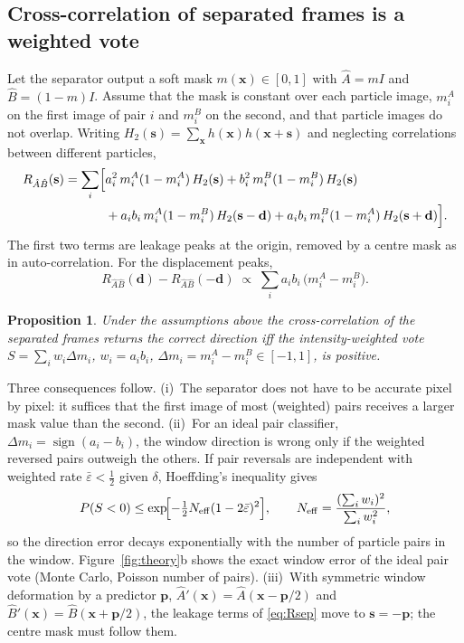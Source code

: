 \documentclass[11pt]{article}
\newtheorem{proposition}{Proposition}
\theoremstyle{remark}
\newcommand{\x}{\mathbf{x}}
\newcommand{\s}{\mathbf{s}}
\newcommand{\dd}{\mathbf{d}}
\newcommand{\p}{\mathbf{p}}
\begin{document}
\subsection{Cross-correlation of separated frames is a weighted vote}
Let the separator output a soft mask $m(\x)\in[0,1]$ with $\hat A=mI$ and $\hat B=(1-m)I$.
Assume that the mask is constant over each particle image, $m_i^A$ on the first image of pair $i$ and $m_i^B$ on the second, and that particle images do not overlap.
Writing $H_2(\s)=\sum_\x h(\x)h(\x+\s)$ and neglecting correlations between different particles,
\begin{align}
R_{\hat A\hat B}(\s)=\sum_i\Bigl[&a_i^2\,m_i^A(1-m_i^A)\,H_2(\s)+b_i^2\,m_i^B(1-m_i^B)\,H_2(\s)\nonumber\\
&+a_ib_i\,m_i^A(1-m_i^B)\,H_2(\s-\dd)+a_ib_i\,m_i^B(1-m_i^A)\,H_2(\s+\dd)\Bigr].
\label{eq:Rsep}
\end{align}
The first two terms are leakage peaks at the origin, removed by a centre mask as in auto-correlation.
For the displacement peaks,
\begin{equation}
R_{\hat A\hat B}(\dd)-R_{\hat A\hat B}(-\dd)\;\propto\;\sum_i a_ib_i\,\bigl(m_i^A-m_i^B\bigr).
\label{eq:vote}
\end{equation}
\begin{proposition}\label{prop:vote}
Under the assumptions above the cross-correlation of the separated frames returns the correct direction iff the intensity-weighted vote $S=\sum_i w_i\Delta m_i$, $w_i=a_ib_i$, $\Delta m_i=m_i^A-m_i^B\in[-1,1]$, is positive.
\end{proposition}
Three consequences follow.
(i)~The separator does not have to be accurate pixel by pixel: it suffices that the first image of most (weighted) pairs receives a larger mask value than the second.
(ii)~For an ideal pair classifier, $\Delta m_i=\operatorname{sign}(a_i-b_i)$, the window direction is wrong only if the weighted reversed pairs outweigh the others. If pair reversals are independent with weighted rate $\bar\varepsilon<\frac12$ given $\delta$, Hoeffding's inequality \citep{hoeffding1963} gives
\begin{equation}
P(S<0)\le\exp\!\Bigl[-\tfrac12 N_\mathrm{eff}(1-2\bar\varepsilon)^2\Bigr],\qquad N_\mathrm{eff}=\frac{(\sum_iw_i)^2}{\sum_iw_i^2},
\label{eq:hoeffding}
\end{equation}
so the direction error decays exponentially with the number of particle pairs in the window. Figure~\ref{fig:theory}b shows the exact window error of the ideal pair vote (Monte Carlo, Poisson number of pairs).
(iii)~With symmetric window deformation by a predictor $\p$, $\hat A'(\x)=\hat A(\x-\p/2)$ and $\hat B'(\x)=\hat B(\x+\p/2)$, the leakage terms of \eqref{eq:Rsep} move to $\s=-\p$; the centre mask must follow them.
\end{document}
